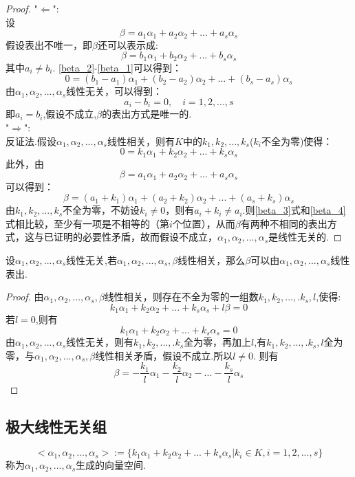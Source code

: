 \documentclass[blue,normal,cn]{elegantnote}
\begin{document}
\begin{proof}
    "$\Leftarrow$":\\
    设
    \begin{equation}
    β=a_1α_1+a_2α_2+...+a_sα_s  \label{beta_1}
    \end{equation}
    假设表出不唯一，即$β$还可以表示成:
    \begin{equation}
    β=b_1 α_1+b_2 α_2+...+b_s α_s  \label{beta_2}
    \end{equation}
    其中$a_i ≠ b_i$.
    \eqref{beta_2}-\eqref{beta_1}可以得到：
    $$
        0=(b_1-a_1)α_1+(b_2-a_2)α_2+...+(b_s-a_s)α_s 
    $$
    由$α_1,α_2,...,α_s$线性无关，可以得到：
    $$
        a_i-b_i=0,\quad i=1,2,...,s
    $$
    即$a_i=b_i$,假设不成立,$β$的表出方式是唯一的.\\
    "$\Rightarrow$":\\
    反证法.假设$α_1,α_2,...,α_s$线性相关，则有$K$中的$k_1,k_2,...,k_s$($k_i$不全为零)使得：
    $$
        0=k_1α_1+k_2α_2+...+k_sα_s 
    $$
    此外，由
    \begin{equation}
    β=a_1α_1+a_2α_2+...+a_sα_s  \label{beta_3}
    \end{equation}
    可以得到：
    \begin{equation}
        β=(a_1+k_1)α_1+(a_2+k_2)α_2+...+(a_s+k_s)α_s  \label{beta_4}
    \end{equation}
    由$k_1,k_2,...,k_s$不全为零，不妨设$k_i ≠ 0$，则有$a_i+k_i ≠ a_i$.则\eqref{beta_3}式和\eqref{beta_4}式相比较，至少有一项是不相等的（第$i$个位置），从而$β$有两种不相同的表出方式，这与已证明的必要性矛盾，故而假设不成立，$α_1,α_2,...,α_s$是线性无关的.
\end{proof}

\begin{proposition}
    设$α_1,α_2,...,α_s$线性无关,若$α_1,α_2,...,α_s,β$线性相关，那么$β$可以由$α_1,α_2,...,α_s$线性表出.
\end{proposition}
\begin{proof}
    由$α_1,α_2,...,α_s,β$线性相关，则存在不全为零的一组数$k_1,k_2,...,.k_s,l$,使得:
    $$
        k_1 α_1+k_2 α_2+...+k_s α_s+l β =0 
    $$
    若$l=0$,则有
    $$
        k_1 α_1+k_2 α_2+...+k_s α_s=0 
    $$
    由$α_1,α_2,...,α_s$线性无关，则有$k_1,k_2,...,.k_s$全为零，再加上$l$,有$k_1,k_2,...,.k_s,l$全为零，与$α_1,α_2,...,α_s,β$线性相关矛盾，假设不成立.所以$l\neq 0$.
    则有
    $$
         β =-\frac{k_1}{l} α_1-\frac{k_2}{l} α_2-...-\frac{k_s}{l} α_s 
    $$
\end{proof}


\subsection{极大线性无关组}
\begin{definition}
    $$
        <α_1,α_2,...,α_s>:=\{k_1 α_1+k_2 α_2+...+k_s α_s|k_i\in K,i=1,2,...,s\}
    $$
称为$α_1,α_2,...,α_s$生成的向量空间.
\end{definition}
\end{document}
